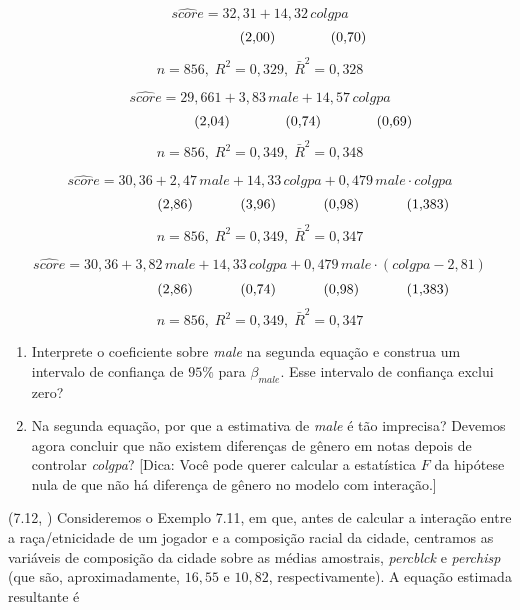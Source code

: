 \documentclass[12pt,letterpaper, onecolumn]{exam}
\begin{document}
\begin{questions}
\[
\widehat{score} = 32{,}31 + 14{,}32\,colgpa
\]
\[
\hspace{2.2cm} (2{,}00)\hspace{1.4cm}(0{,}70)
\]
\[
n = 856,\; R^2 = 0{,}329,\; \bar{R}^2 = 0{,}328
\]

\[
\widehat{score} = 29{,}661 + 3{,}83\,male + 14{,}57\,colgpa
\]
\[
\hspace{2.2cm} (2{,}04)\hspace{1.4cm}(0{,}74)\hspace{1.4cm}(0{,}69)
\]
\[
n = 856,\; R^2 = 0{,}349,\; \bar{R}^2 = 0{,}348
\]

\[
\widehat{score} = 30{,}36 + 2{,}47\,male + 14{,}33\,colgpa + 0{,}479\,male \cdot colgpa
\]
\[
\hspace{2.2cm} (2{,}86)\hspace{1.2cm}(3{,}96)\hspace{1.2cm}(0{,}98)\hspace{1.2cm}(1{,}383)
\]
\[
n = 856,\; R^2 = 0{,}349,\; \bar{R}^2 = 0{,}347
\]

\[
\widehat{score} = 30{,}36 + 3{,}82\,male + 14{,}33\,colgpa + 0{,}479\,male \cdot (colgpa - 2{,}81)
\]
\[
\hspace{2.2cm} (2{,}86)\hspace{1.2cm}(0{,}74)\hspace{1.2cm}(0{,}98)\hspace{1.2cm}(1{,}383)
\]
\[
n = 856,\; R^2 = 0{,}349,\; \bar{R}^2 = 0{,}347
\]

\begin{enumerate}[label=(\roman*)]
    \item Interprete o coeficiente sobre \textit{male} na segunda equação e construa um intervalo de confiança de \(95\%\) para \(\beta_{male}\). Esse intervalo de confiança exclui zero?
    \item Na segunda equação, por que a estimativa de \textit{male} é tão imprecisa? Devemos agora concluir que não existem diferenças de gênero em notas depois de controlar \textit{colgpa}? [Dica: Você pode querer calcular a estatística \(F\) da hipótese nula de que não há diferença de gênero no modelo com interação.]
\end{enumerate}

\vspace{0.7cm}

\question\qstar (7.12, \citep{wooldridge2016}) Consideremos o Exemplo 7.11, em que, antes de calcular a interação entre a raça/etnicidade de um jogador e a composição racial da cidade, centramos as variáveis de composição da cidade sobre as médias amostrais, \textit{percblck} e \textit{perchisp} (que são, aproximadamente, \(16{,}55\) e \(10{,}82\), respectivamente). A equação estimada resultante é


\end{questions}
\end{document}
